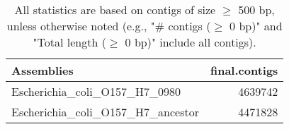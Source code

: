 \documentclass[12pt,a4paper]{article}
\begin{document}
\begin{table}[ht]
\begin{center}
\caption{All statistics are based on contigs of size $\geq$ 500 bp, unless otherwise noted (e.g., "\# contigs ($\geq$ 0 bp)" and "Total length ($\geq$ 0 bp)" include all contigs).}
\begin{tabular}{|l*{1}{|r}|}
\hline
Assemblies & final.contigs \\ \hline
Escherichia\_coli\_O157\_H7\_0980 & 4639742 \\ \hline
Escherichia\_coli\_O157\_H7\_ancestor & 4471828 \\ \hline
\end{tabular}
\end{center}
\end{table}
\end{document}
